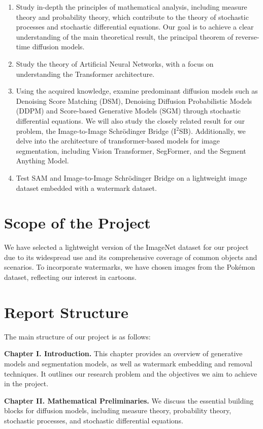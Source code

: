 \begin{enumerate}
    \item Study in-depth the principles of mathematical analysis, including measure theory and probability theory, which contribute to the theory of stochastic processes and stochastic differential equations. Our goal is to achieve a clear understanding of the main theoretical result, the principal theorem of reverse-time diffusion models.
    \item Study the theory of Artificial Neural Networks, with a focus on understanding the Transformer architecture.
    \item Using the acquired knowledge, examine predominant diffusion models such as Denoising Score Matching (DSM), Denoising Diffusion Probabilistic Models (DDPM) and Score-based Generative Models (SGM) through stochastic differential equations. We will also study the closely related result for our problem, the Image-to-Image Schrödinger Bridge (I$^2$SB). Additionally, we delve into the architecture of transformer-based models for image segmentation, including Vision Transformer, SegFormer, and the Segment Anything Model.
    \item Test SAM and Image-to-Image Schrödinger Bridge on a lightweight image dataset embedded with a watermark dataset. 
\end{enumerate}

\section{Scope of the Project}
We have selected a lightweight version of the ImageNet dataset for our project due to its widespread use and its comprehensive coverage of common objects and scenarios. To incorporate watermarks, we have chosen images from the Pokémon dataset, reflecting our interest in cartoons.

\section{Report Structure}
The main structure of our project is as follows:

\textbf{Chapter I. Introduction.} This chapter provides an overview of generative models and segmentation models, as well as watermark embedding and removal techniques. It outlines our research problem and the objectives we aim to achieve in the project.

\textbf{Chapter II. Mathematical Preliminaries.} We discuss the essential building blocks for diffusion models, including measure theory, probability theory, stochastic processes, and stochastic differential equations.

